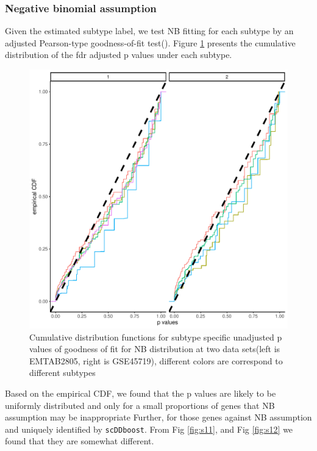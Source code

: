 \documentclass[aoas,preprint]{imsart}
\begin{document}
\subsubsection{Negative binomial assumption}

Given the estimated subtype label, we test NB fitting for each subtype by an adjusted Pearson-type goodness-of-fit test(\cite{Yin:2013aa}).
Figure \ref{fig:nb} presents the cumulative distribution of the fdr adjusted p values under each subtype.

\begin{figure}[h!]
  \includegraphics[width=\linewidth]{Figs/nbfit.pdf}
  \caption{Cumulative distribution functions for subtype specific unadjusted p values of goodness of fit for NB distribution at two data sets(left is EMTAB2805, right is GSE45719), different colors are correspond to different subtypes}
  \label{fig:nb}
\end{figure}
Based on the empirical CDF,
we found that the p values are likely to be uniformly distributed and only for a small proportions of genes that NB assumption may be inappropriate
Further,
for those genes against NB assumption and uniquely identified by \texttt{scDDboost}. From Fig \ref{fig:s11}, and Fig \ref{fig:s12} we found that they are somewhat different.
\end{document}
